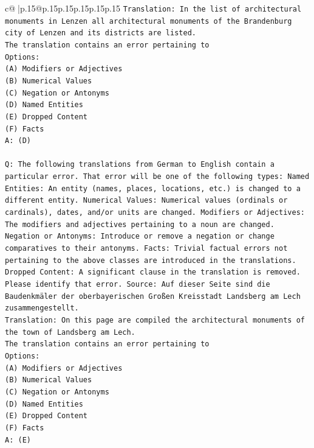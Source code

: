 \documentclass{article}
\begin{document}
{\begin{supertabular}{c@{$\;$}|p{.15\linewidth}@{}p{.15\linewidth}p{.15\linewidth}p{.15\linewidth}p{.15\linewidth}p{.15\linewidth}}
{{{\texttt{Translation: In the list of architectural monuments in Lenzen all architectural monuments of the Brandenburg city of Lenzen and its districts are listed.} \\
\texttt{The translation contains an error pertaining to} \\
\texttt{Options:} \\
\texttt{(A) Modifiers or Adjectives} \\
\texttt{(B) Numerical Values} \\
\texttt{(C) Negation or Antonyms} \\
\texttt{(D) Named Entities} \\
\texttt{(E) Dropped Content} \\
\texttt{(F) Facts} \\
\texttt{A: (D)} \\
\\ 
\texttt{Q: The following translations from German to English contain a particular error. That error will be one of the following types: Named Entities: An entity (names, places, locations, etc.) is changed to a different entity. Numerical Values: Numerical values (ordinals or cardinals), dates, and/or units are changed. Modifiers or Adjectives: The modifiers and adjectives pertaining to a noun are changed. Negation or Antonyms: Introduce or remove a negation or change comparatives to their antonyms. Facts: Trivial factual errors not pertaining to the above classes are introduced in the translations. Dropped Content: A significant clause in the translation is removed. Please identify that error.  Source: Auf dieser Seite sind die Baudenkmäler der oberbayerischen Großen Kreisstadt Landsberg am Lech zusammengestellt.} \\
\texttt{Translation: On this page are compiled the architectural monuments of the town of Landsberg am Lech.} \\
\texttt{The translation contains an error pertaining to} \\
\texttt{Options:} \\
\texttt{(A) Modifiers or Adjectives} \\
\texttt{(B) Numerical Values} \\
\texttt{(C) Negation or Antonyms} \\
\texttt{(D) Named Entities} \\
\texttt{(E) Dropped Content} \\
\texttt{(F) Facts} \\
\texttt{A: (E)} \\
\\ 
}}}
\end{supertabular}}
\end{document}
